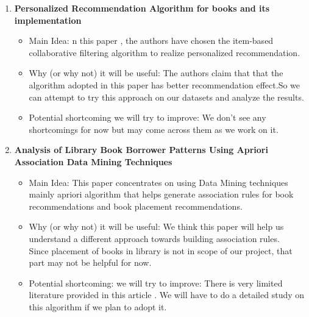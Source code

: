 \begin{enumerate}[label=(\arabic*)]
    \item \cite{li2021personalized} \textbf{Personalized Recommendation Algorithm for books and its implementation}
    \begin{itemize}
        \item Main Idea: n this paper , the authors have chosen the item-based collaborative filtering algorithm to realize personalized recommendation.
        \item Why (or why not) it will be useful: The authors claim that that the algorithm adopted in this paper has better recommendation effect.So we can attempt to try this approach on our datasets and analyze the results.
        \item Potential shortcoming we will try to improve: We don't see any shortcomings for now but may come across them as we work on it.
    \end{itemize}
    \item \cite{zamzami2021analysis} \textbf{Analysis of Library Book Borrower Patterns Using Apriori Association Data Mining Techniques}
    \begin{itemize}
        \item Main Idea: This paper concentrates on using Data Mining techniques mainly apriori algorithm that helps generate association rules for book recommendations and book placement recommendations.
        \item Why (or why not) it will be useful: We think this paper will help us understand a different approach towards building association rules.\\
        Since  placement of books in library is not in scope of our project, that part may not be helpful for now.
        \item Potential shortcoming: we will try to improve: There is very limited literature provided in this article . We will have to do a detailed study on this algorithm if we plan to adopt it.
    \end{itemize}

\end{enumerate}